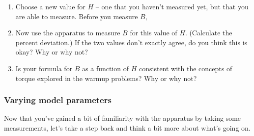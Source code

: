 \begin{enumerate}[series=labproc,label={\bf \arabic*.},
		ref=\textcolor{black}{\arabic*}]

\item
Choose a new value for $H$ -- one that you haven't measured yet,
but that you are able to measure.  
Before you measure $B$, 


\item
Now use the apparatus to measure $B$ for this value of $H$.  
(Calculate the percent deviation.)
If the two values don't exactly agree, do
you think this is okay?  
Why or why not?

\item
Is your formula for $B$ as a function of $H$ consistent with 
the concepts of torque explored in the warmup problems? 
Why or why not?

\end{enumerate}



\subsubsection*{Varying model parameters}

Now that you've gained a bit of familiarity with the apparatus
by taking some measurements, 
let's take a step back and think a bit more about what's going on.

